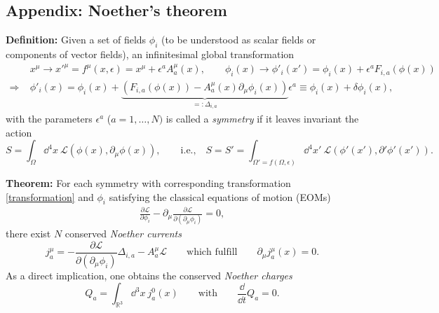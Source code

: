 \documentclass[11pt]{latex/exercise}
\begin{document}
\subsection*{Appendix: Noether's theorem}
\label{B:Apendix}
\textbf{Definition:} Given a set of fields $\phi_i$ (to be understood as scalar fields or components of vector fields), an infinitesimal global transformation
\begin{equation}
    \label{transformation}
    \begin{split}
                       & x^\mu \rightarrow x'^\mu = f^\mu(x, \epsilon) = x^\mu + \epsilon^a A^\mu_a (x) , \qquad \phi_i (x) \rightarrow \phi'_i (x') = \phi_i (x) + \epsilon^a F_{i,a} (\phi(x)) \\
        \Rightarrow \; & \phi'_i (x) = \phi_i (x) + \underbrace{\left( F_{i,a} (\phi(x)) - A^\mu_a (x) \partial_\mu \phi_i (x) \right)}_{\displaystyle =: \Delta_{i,a}} \epsilon^a
        \equiv \phi_i (x) + \delta \phi_i (x),
    \end{split}
\end{equation}
with the parameters $\epsilon^a$ ($a = 1, \dots, N)$ is called a \textit{symmetry} if it leaves invariant the action
\begin{equation}
    \label{eq:action_invariance}
    S = \int_{\Omega} \dd^4 x \: \mathcal{L}(\phi(x), \partial_\mu \phi(x)) , \qquad \text{i.e.,} \quad
    S = S'
    = \int_{\Omega' = f(\Omega, \epsilon)} \dd^4 x' \: \mathcal{L}(\phi'(x'), \partial' \phi'(x')).
\end{equation}

\textbf{Theorem:} For each symmetry with corresponding transformation \eqref{transformation} and $\phi_i$ satisfying the classical equations of motion (EOMs)
\begin{align}
    \frac{\partial \mathcal{L}}{\partial \phi_i} - \partial_\mu \frac{\partial \mathcal{L}}{\partial(\partial_\mu \phi_i)} = 0,
\end{align}
there exist $N$ conserved \textit{Noether currents}
\begin{equation}
    \label{eq:noether_current}
    j^\mu_a = -\frac{\partial \mathcal{L}}{\partial (\partial_\mu \phi_i)} \Delta_{i,a} - A^\mu_a \mathcal{L} \qquad \text{which fulfill} \qquad \partial_\mu j^\mu_a (x) = 0 .
\end{equation}
As a direct implication, one obtains the conserved \textit{Noether charges}
\begin{equation}
    Q_a = \int_{\mathbb{R}^3} \dd^3 x \: j^0_a (x) \qquad \text{with} \qquad \frac{\dd}{\dd t} Q_a = 0 .
\end{equation}
\end{document}
